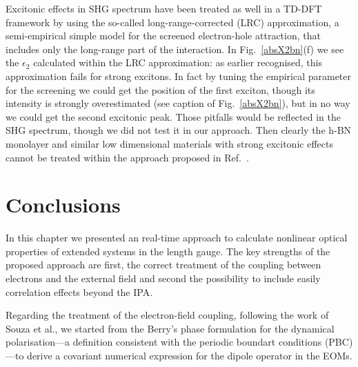 Excitonic effects in SHG spectrum have been treated as well in a TD-DFT framework\cite{PhysRevB.82.235201} by using the so-called long-range-corrected (LRC) approximation,\cite{LRC} a semi-empirical simple model for the screened electron-hole attraction, that includes only the long-range part of the interaction. In Fig.~\ref{absX2bn}(f) we see the $\epsilon_2$ calculated within the LRC approximation: as earlier recognised, this approximation fails for strong excitons. In fact by tuning the empirical parameter for the screening we could get the position of the first exciton, though its intensity is strongly overestimated (see caption of Fig.~\ref{absX2bn}), but in no way we could get the second excitonic peak. Those pitfalls would be reflected in the SHG spectrum, though we did not test it in our approach. Then clearly the h-BN monolayer and similar low dimensional materials with strong excitonic effects cannot be treated within the approach proposed in Ref.~\cite{PhysRevB.82.235201}.

\section{Conclusions}\label{conclusion}                                        
In this chapter we presented an \ai real-time approach to calculate nonlinear optical properties of extended systems in the length gauge. The key strengths of the proposed approach are first, the correct treatment of the coupling between electrons and the external field and second the possibility to include easily correlation effects beyond the IPA.

Regarding the treatment of the electron-field coupling, following the work of Souza et al.\cite{souza_prb}, we started from the Berry's phase formulation for the dynamical polarisation---a definition consistent with the periodic boundart conditions (PBC)---to derive a covariant numerical expression for the dipole operator in the EOMs.

